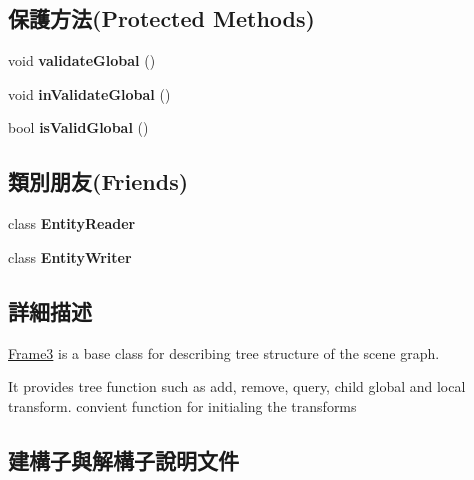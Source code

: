 \subsection*{保護方法(Protected Methods)}
\begin{DoxyCompactItemize}
\item 
void {\bfseries validate\+Global} ()\hypertarget{class_magnum_1_1_frame3_a2f139c2613158b8c3010ea7d181b62e0}{}\label{class_magnum_1_1_frame3_a2f139c2613158b8c3010ea7d181b62e0}

\item 
void {\bfseries in\+Validate\+Global} ()\hypertarget{class_magnum_1_1_frame3_a5500537ed5f813c27730120d0e34f321}{}\label{class_magnum_1_1_frame3_a5500537ed5f813c27730120d0e34f321}

\item 
bool {\bfseries is\+Valid\+Global} ()\hypertarget{class_magnum_1_1_frame3_ab4fcebc1760d6c27be78d9135e59322e}{}\label{class_magnum_1_1_frame3_ab4fcebc1760d6c27be78d9135e59322e}

\end{DoxyCompactItemize}
\subsection*{類別朋友(Friends)}
\begin{DoxyCompactItemize}
\item 
class {\bfseries Entity\+Reader}\hypertarget{class_magnum_1_1_frame3_a56e67fba8094d0ad6c4e9a70157aeea0}{}\label{class_magnum_1_1_frame3_a56e67fba8094d0ad6c4e9a70157aeea0}

\item 
class {\bfseries Entity\+Writer}\hypertarget{class_magnum_1_1_frame3_a2530bdf39e07c94e0f4b49472a0ac288}{}\label{class_magnum_1_1_frame3_a2530bdf39e07c94e0f4b49472a0ac288}

\end{DoxyCompactItemize}


\subsection{詳細描述}
\hyperlink{class_magnum_1_1_frame3}{Frame3} is a base class for describing tree structure of the scene graph. 

It provides tree function such as add, remove, query, child global and local transform. convient function for initialing the transforms 

\subsection{建構子與解構子說明文件}
